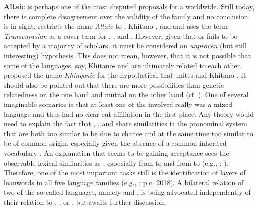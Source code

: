 \textbf{Altaic} is perhaps one of the most disputed proposals for a  worldwide. Still today, there is complete disagreement over the validity of the family and no conclusion is in sight. \citet{Robbeets2015} restricts the name \textit{Altaic} to , Khitano-, and  and uses the term \textit{Transeurasian} as a cover term for , , and . However, given that  or  fails to be accepted by a majority of scholars, it must be considered an \textit{unproven} (but still interesting) hypothesis. This does not mean, however, that it is not possible that some of the languages, say, Khitano- and  are ultimately related to each other. \citet{Janhunen1996} proposed the name \textit{Khinganic} for the hypothetical  that unites  and Khitano-. It should also be pointed out that there are more possibilities than genetic relatedness on the one hand and mutual  on the other hand (cf. \citealt{Doerfer1985}). One of several imaginable scenarios is that at least one of the  involved really was a mixed language and thus had no clear-cut affiliation in the first place. Any theory would need to explain the fact that , , and  share similarities in the pronominal system that are both too similar to be due to chance and at the same time too similar to be of common origin, especially given the absence of a common inherited vocabulary \citep[221]{Janhunen2013}. An explanation that seems to be gaining acceptance sees the observable lexical similarities as , especially from  to  and from  to  (e.g., \citealt{Doerfer1985}; \citealt{Schönig2003}). Therefore, one of the most important tasks still is the identification of layers of loanwords in all five language families (e.g., \citealt{Khabtagaeva2017}; p.c. 2018). A bilateral relation of two of the so-called  languages, namely  and , is being advocated independently of their relation to , , or  \citep{Whitman2012}, but awaits further discussion.
